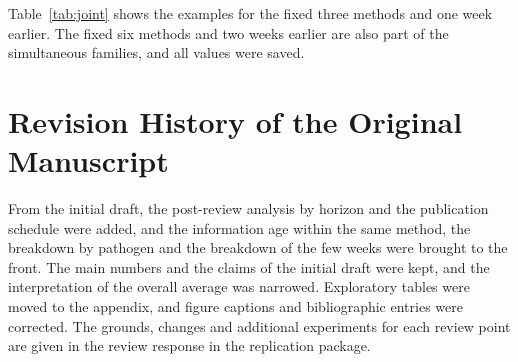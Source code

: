 \documentclass[11pt]{article}
\newcommand{\gentable}[1]{\adjustbox{max width=\linewidth}{}}
\begin{document}
\begin{table}[H]\centering\small
\caption{Comparison families for the simultaneous intervals.}\label{tab:jointsummary}
\gentable{tab_joint_summary}
\end{table}

Table~\ref{tab:joint} shows the examples for the fixed three methods and one week earlier. The fixed six methods and two weeks earlier are also part of the simultaneous families, and all values were saved.

\begin{table}[H]\centering\small
\caption{Nominal and simultaneous intervals in the joint period (fixed three methods, one week earlier). Both intervals use the same period and the same forecasts. Differences from the original full-period Chronos-Bolt table include the effect of aligning the evaluation period. An interval that includes 1 is not taken as proof of no effect or of equivalence, and an exploratory interval that excludes 1 is not treated as an independent confirmation.}\label{tab:joint}
\gentable{tab_joint}
\end{table}

\section{Revision History of the Original Manuscript}

From the initial draft, the post-review analysis by horizon and the publication schedule were added, and the information age within the same method, the breakdown by pathogen and the breakdown of the few weeks were brought to the front. The main numbers and the claims of the initial draft were kept, and the interpretation of the overall average was narrowed. Exploratory tables were moved to the appendix, and figure captions and bibliographic entries were corrected. The grounds, changes and additional experiments for each review point are given in the review response in the replication package.
\end{document}
